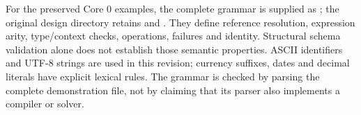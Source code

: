 For the preserved Core 0 examples, the complete grammar is supplied as
; the original design directory retains
 and . They define reference resolution, expression arity,
type/context checks, operations, failures and identity. Structural schema
validation alone does not establish those semantic properties. ASCII
identifiers and UTF-8 strings are used in this revision; currency suffixes,
dates and decimal literals have explicit lexical rules. The grammar is checked
by parsing the complete demonstration file, not by claiming that its parser
also implements a compiler or solver.


